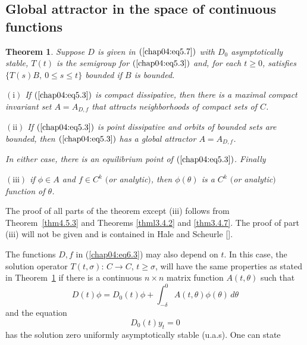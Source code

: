\documentclass{surv-l}
\theoremstyle{plain}
\newtheorem{theorem}{Theorem}[section]
\theoremstyle{definition}
\numberwithin{equation}{section}
\numberwithin{figure}{chapter}
\begin{document}
\subsection{Global attractor in the space of continuous functions}\label{subsec4.5.2}

\begin{theorem}\label{thm4.5.4} Suppose $D$ is given in $(\ref{chap04:eq5.7})$ with $D_{0}$ asymptotically stable, $T(t)$ is the semigroup for $(\ref{chap04:eq5.3})$ and, for each $t\geq 0$, satisfies $\{T(s)B,\ 0\leq s\leq t\}$ bounded if $B$ is bounded.

$\mathrm{(i)}$ If $(\ref{chap04:eq5.3})$ is compact dissipative, then there is a maximal compact invariant set $A=A_{D,f}$ that attracts neighborhoods of compact sets of $C$.

$\mathrm{(ii)}$ If $(\ref{chap04:eq5.3})$ is point dissipative and orbits of bounded sets are bounded, then $(\ref{chap04:eq5.3})$ has a global attractor $A=A_{D,f}$.

In either case, there is an equilibrium point of $(\ref{chap04:eq5.3})$. Finally

$\mathrm{(iii)}$ if $\phi\in A$ and $f\in C^{k}$ $($or analytic$)$, then $\phi(\theta)$ is a $C^{k}$ $($or analytic$)$ function of $\theta$.
\end{theorem}

The proof of all parts of the theorem except (iii) follows from Theorem~\ref{thm4.5.3} and Theorems \ref{thml3.4.2} and \ref{thm3.4.7}. The proof of part (iii) will not be given and is contained in Hale and Scheurle [\citeyear{1985hs}].

The functions $D, f$ in (\ref{chap04:eq6.3}) may also depend on $t$. In this case, the solution operator $T(t, \sigma):\,C\rightarrow C,\, t\geq\sigma$, will have the same properties as stated in Theorem~\ref{thm4.5.4} if there is a continuous $n\times n$ matrix function $A(t, \theta)$ such that
\begin{equation}\label{chap04:eq5.15}
D(t)\phi=D_{0}(t)\phi+\int_{-\delta}^{0}A(t, \theta)\phi(\theta)\,d\theta
\end{equation}
and the equation
\begin{equation}\label{chap04:eq5.16}
D_{0}(t)y_{t}=0
\end{equation}
has the solution zero uniformly asymptotically stable (u.a.s). One can state
\end{document}
